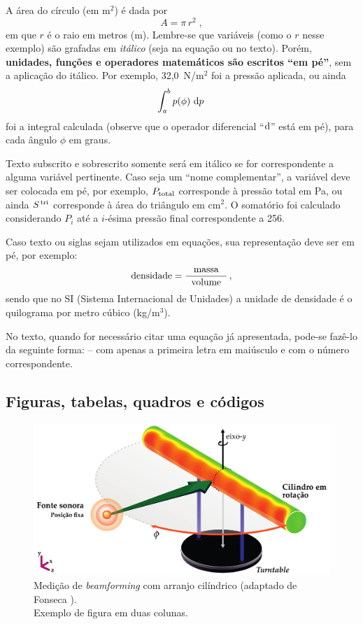 \documentclass[12pt, a4paper, twoside, twocolumn]{article}
\begin{document}
A área do círculo (em m$^2$) é dada por 
\begin{equation}
	A = \pi \, r^2\;,
\label{eq:area-circ}
\end{equation}
%
em que $r$ é o raio em metros (m). Lembre-se que variáveis (como o $r$ nesse exemplo) são grafadas em \textit{itálico} (seja na equação ou no texto). Porém, \textbf{unidades, funções e operadores matemáticos são escritos ``em pé''}, sem a aplicação do itálico. Por exemplo, 32,0~N/m$^2$ foi a pressão aplicada, ou ainda
%
\begin{equation}
	\int_a^b p(\phi)\, \operatorname{d\!} p\,
\label{eq:int}
\end{equation}
%
foi a integral calculada (observe que o operador diferencial ``$\text{d}$'' está em pé), para cada ângulo $\phi$ em graus.


Texto subscrito e sobrescrito somente será em itálico se for correspondente a alguma variável pertinente. Caso seja um ``nome complementar'', a variável deve ser colocada em pé, por exemplo, $P_{\text{total}}$ corresponde à pressão total em Pa, ou ainda $S^{\text{\,tri}}$ corresponde à área do triângulo em cm$^2$. O somatório foi calculado considerando $P_i$ até a $i$-ésima pressão final correspondente a 256.

Caso texto ou siglas sejam utilizados em equações, sua representação deve ser em pé, por exemplo:
%
\begin{equation}
	\text{densidade} = \frac{\text{massa}}{\;\;\text{volume}\;\;}\,,
\label{eq:densidade}
\end{equation}
%
sendo que no SI (Sistema Internacional de Unidades) a unidade de densidade é o quilograma por metro cúbico (kg/m$^3$).
%

No texto, quando for necessário citar uma equação já apresentada, pode-se fazê-lo da seguinte forma:  -- com apenas a primeira letra em maiúsculo e com o número correspondente.

\subsection{Figuras, tabelas, quadros e códigos}

\begin{figure}[!t]
	\centering
	\includegraphics[width=0.75\linewidth]{Figuras/Measurement-Scheme-Fonseca-2013.pdf}%
	\caption{Medição de \textit{beamforming} com arranjo cilíndrico (adaptado de Fonseca \cite{Fonseca-2013}).\\ Exemplo de figura em duas colunas.}%
	\label{fig:beamforming}%
\end{figure}
\end{document}
